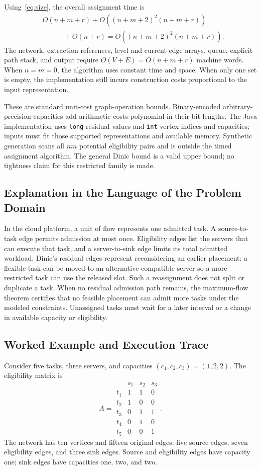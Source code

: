 \documentclass[conference]{IEEEtran}
\theoremstyle{definition}
\theoremstyle{remark}
\begin{document}
Using~\eqref{eq:size}, the overall assignment time is
\begin{align}
&O(n+m+r)+O((n+m+2)^2(n+m+r))\nonumber\\
&\hspace{3em}+O(n+r)
=O((n+m+2)^2(n+m+r)).
\end{align}
The network, extraction references, level and current-edge arrays, queue,
explicit path stack, and output require $O(V+E)=O(n+m+r)$ machine words.
When $n=m=0$, the algorithm uses constant time and space. When only one
set is empty, the implementation still incurs construction costs
proportional to the input representation.

These are standard unit-cost graph-operation bounds. Binary-encoded
arbitrary-precision capacities add arithmetic costs polynomial in their bit
lengths. The Java implementation uses \texttt{long} residual values and
\texttt{int} vertex indices and capacities; inputs must fit those supported
representations and available memory. Synthetic generation scans all
$nm$ potential eligibility pairs and is outside the timed assignment
algorithm. The general Dinic bound is a valid upper bound; no tightness
claim for this restricted family is made.

\subsection{Explanation in the Language of the Problem Domain}
In the cloud platform, a unit of flow represents one admitted task.
A source-to-task edge permits admission at most once. Eligibility edges
list the servers that can execute that task, and a server-to-sink edge
limits its total admitted workload. Dinic's residual edges represent
reconsidering an earlier placement: a flexible task can be moved to an
alternative compatible server so a more restricted task can use the
released slot. Such a reassignment does not split or duplicate a task.
When no residual admission path remains, the maximum-flow theorem
certifies that no feasible placement can admit more tasks under the
modeled constraints. Unassigned tasks must wait for a later interval
or a change in available capacity or eligibility.

\subsection{Worked Example and Execution Trace}
Consider five tasks, three servers, and capacities $(c_1,c_2,c_3)=(1,2,2)$.
The eligibility matrix is
\begin{equation}
A=\begin{array}{c|ccc}
 &s_1&s_2&s_3\\\hline
t_1&1&1&0\\
t_2&1&0&0\\
t_3&0&1&1\\
t_4&0&1&0\\
t_5&0&0&1
\end{array}.
\end{equation}
The network has ten vertices and fifteen original edges: five source edges,
seven eligibility edges, and three sink edges. Source and eligibility
edges have capacity one; sink edges have capacities one, two, and two.
\end{document}
